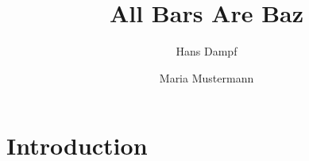 \documentclass{svproc}
\begin{document}
    \title{All Bars Are Baz}
    \author{Hans Dampf \and Maria Mustermann}
    \maketitle
    
  \begin{abstract}
  	\lipsum[1-3]
  \end{abstract}

	\section{Introduction}
	
	\lipsum[4-10]
\end{document}
